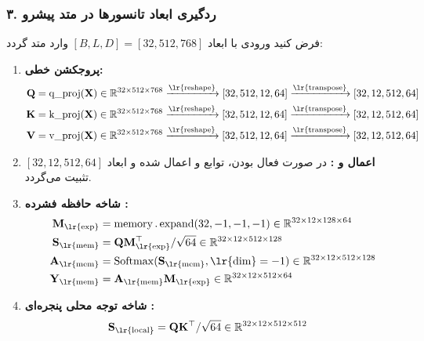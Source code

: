 \subsubsection*{۳. ردگیری ابعاد تانسورها در متد پیشرو }
فرض کنید ورودی  با ابعاد $[B, L, D] = [32, 512, 768]$ وارد متد گردد:
\begin{enumerate}
    \item \textbf{پروجکشن خطی:} 
    \begin{align*}
    \mathbf{Q} &= \operatorname{q\_proj}(\mathbf{X}) \in \mathbb{R}^{32 \times 512 \times 768} \xrightarrow{\text{\lr{reshape}}} [32, 512, 12, 64] \xrightarrow{\text{\lr{transpose}}} [32, 12, 512, 64] \\
    \mathbf{K} &= \operatorname{k\_proj}(\mathbf{X}) \in \mathbb{R}^{32 \times 512 \times 768} \xrightarrow{\text{\lr{reshape}}} [32, 512, 12, 64] \xrightarrow{\text{\lr{transpose}}} [32, 12, 512, 64] \\
    \mathbf{V} &= \operatorname{v\_proj}(\mathbf{X}) \in \mathbb{R}^{32 \times 512 \times 768} \xrightarrow{\text{\lr{reshape}}} [32, 512, 12, 64] \xrightarrow{\text{\lr{transpose}}} [32, 12, 512, 64]
    \end{align*}
    \item \textbf{اعمال  و :} در صورت فعال بودن، توابع  و  اعمال شده و ابعاد $[32, 12, 512, 64]$ تثبیت می‌گردد.
    \item \textbf{شاخه حافظه فشرده :}
    \begin{align*}
    \mathbf{M}_{\text{\lr{exp}}} &= \operatorname{memory}.\operatorname{expand}(32, -1, -1, -1) \in \mathbb{R}^{32 \times 12 \times 128 \times 64} \\
    \mathbf{S}_{\text{\lr{mem}}} &= \mathbf{Q} \mathbf{M}_{\text{\lr{exp}}}^\top / \sqrt{64} \in \mathbb{R}^{32 \times 12 \times 512 \times 128} \\
    \mathbf{A}_{\text{\lr{mem}}} &= \operatorname{Softmax}(\mathbf{S}_{\text{\lr{mem}}}, \text{\lr{dim}}=-1) \in \mathbb{R}^{32 \times 12 \times 512 \times 128} \\
    \mathbf{Y}_{\text{\lr{mem}}} &= \mathbf{A}_{\text{\lr{mem}}} \mathbf{M}_{\text{\lr{exp}}} \in \mathbb{R}^{32 \times 12 \times 512 \times 64}
    \end{align*}
    \item \textbf{شاخه توجه محلی پنجره‌ای :}
    \begin{align*}
    \mathbf{S}_{\text{\lr{local}}} &= \mathbf{Q} \mathbf{K}^\top / \sqrt{64} \in \mathbb{R}^{32 \times 12 \times 512 \times 512}

\end{align*}
\end{enumerate}
